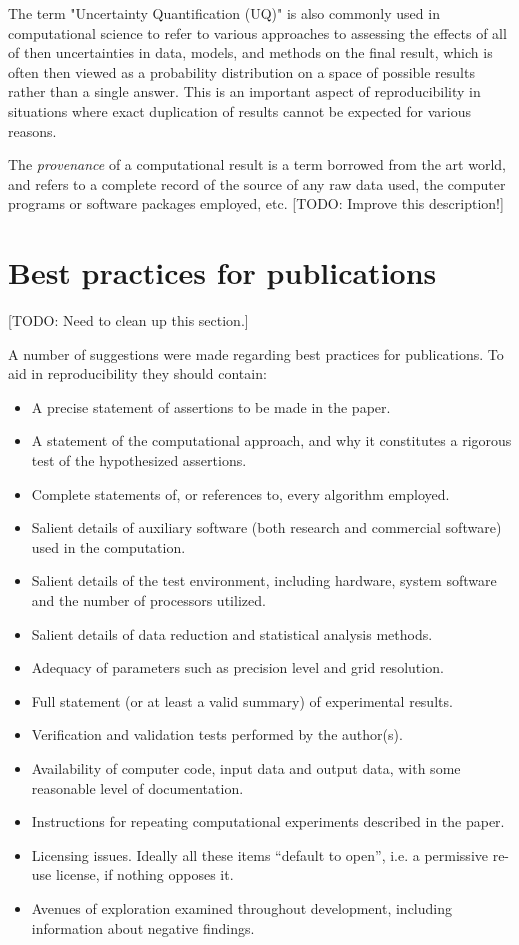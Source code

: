 \documentclass[11pt]{article}
\newcommand{\todo}[1]{{\color{red} [TODO: #1]}}
\newcommand{\todo}[1]{}
\begin{document}
The term "Uncertainty Quantification (UQ)" is also commonly used in
computational science to refer to various approaches to assessing the
effects of all of then uncertainties in data, models, and methods on the
final result, which is often then viewed as a probability distribution on a
space of possible results rather than a single answer.  This is an important
aspect of reproducibility in situations where exact duplication of results
cannot be expected for various reasons.

The {\em provenance} of a computational result is a term borrowed from the
art world, and refers to a complete record of the source of any raw data
used, the computer programs or software packages employed, etc.
\todo{Improve this description!}

\section{Best practices for publications} \label{sec:pubs2}

\todo{Need to clean up this section.}

A number of suggestions were made regarding best practices for publications.
To aid in reproducibility they should contain:

\begin{itemize} 
\item  A precise statement of assertions to be made in the paper.
\item  A statement of the computational approach, and why it constitutes a
rigorous test of the hypothesized assertions.
\item  Complete statements of, or references to, every algorithm employed.
\item  Salient details of auxiliary software (both research and commercial
software) used in the computation.
\item  Salient details of the test environment, including hardware, system
software and the number of processors utilized.
\item  Salient details of data reduction and statistical analysis methods.
\item  Adequacy of parameters such as precision level and grid resolution.
\item  Full statement (or at least a valid summary) of experimental results.
\item  Verification and validation tests performed by the author(s).
\item Availability of computer code, input data and output data, with some
reasonable level of documentation.
\item Instructions for repeating computational experiments described in the
paper.
\item Licensing issues. Ideally all these items ``default to open'',
 i.e. a permissive re-use license, if nothing opposes it.
\item Avenues of exploration examined throughout development, including
information about negative findings.
\end{itemize} 
\end{document}
